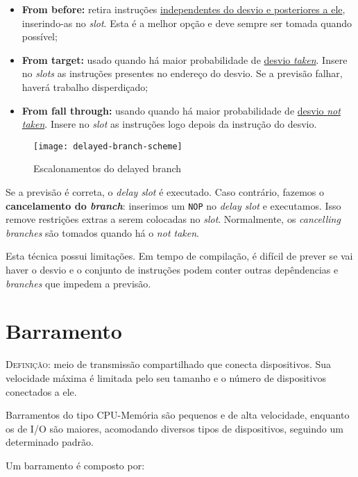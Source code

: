 \begin{itemize}
  \item \textbf{From before:} retira instruções \underline{independentes do desvio e posteriores a ele}, inserindo-as no \textit{slot}. Esta é a melhor opção e deve sempre ser tomada quando possível;

  \item \textbf{From target:} usado quando há maior probabilidade de \underline{desvio \textit{taken}}. Insere no \textit{slots} as instruções presentes no endereço do desvio. Se a previsão falhar, haverá trabalho disperdiçado;

  \item \textbf{From fall through:} usando quando há maior probabilidade de \underline{desvio \textit{not taken}}. Insere no \textit{slot} as instruções logo depois da instrução do desvio.
\end{itemize}

\begin{figure}
  \texttt{[image: delayed-branch-scheme]}
  \label{fig:delayed-branch-scheme}
  \caption{Escalonamentos do delayed branch}
\end{figure}

Se a previsão é correta, o \textit{delay slot} é executado. Caso contrário, fazemos o \textbf{cancelamento do \textit{branch}}: inserimos um \texttt{NOP} no \textit{delay slot} e executamos. Isso remove restrições extras a serem colocadas no \textit{slot}. Normalmente, os \textit{cancelling branches} são tomados quando há o \textit{not taken}.

Esta técnica possui limitações. Em tempo de compilação, é difícil de prever se vai haver o desvio e o conjunto de instruções podem conter outras depêndencias e \textit{branches} que impedem a previsão.




\section{Barramento}
\textsc{Definição:} meio de transmissão compartilhado que conecta dispositivos. Sua velocidade máxima é limitada pelo seu tamanho e o número de dispositivos conectados a ele.

Barramentos do tipo CPU-Memória são pequenos e de alta velocidade, enquanto os de I/O são maiores, acomodando diversos tipos de dispositivos, seguindo um determinado padrão.

Um barramento é composto por:

